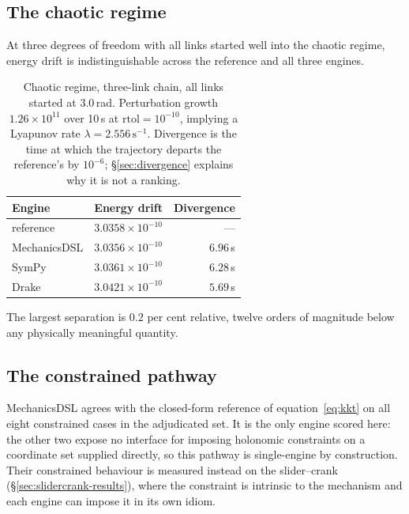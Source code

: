 \documentclass[review,12pt]{elsarticle}
\begin{document}
\subsection{The chaotic regime}\label{sec:chaotic}
At three degrees of freedom with all links started well into the chaotic regime,
energy drift is indistinguishable across the reference and all three engines.

\begin{table}[!htbp]
\centering
\caption{Chaotic regime, three-link chain, all links started at $3.0$\,rad.
Perturbation growth $1.26\times10^{11}$ over 10\,s at
$\mathrm{rtol}=10^{-10}$, implying a Lyapunov rate
$\lambda = 2.556\,\mathrm{s}^{-1}$. Divergence is the time at which the
trajectory departs the reference's by $10^{-6}$; \S\ref{sec:divergence}
explains why it is not a ranking.}
\label{tab:chaotic}
\begin{tabular}{@{}lrr@{}}
\toprule
\textbf{Engine} & \textbf{Energy drift} & \textbf{Divergence} \\
\midrule
reference    & $3.0358\times10^{-10}$ & --- \\
MechanicsDSL & $3.0356\times10^{-10}$ & $6.96$\,s \\
SymPy        & $3.0361\times10^{-10}$ & $6.28$\,s \\
Drake        & $3.0421\times10^{-10}$ & $5.69$\,s \\
\bottomrule
\end{tabular}
\end{table}

\noindent The largest separation is $0.2$ per cent relative, twelve orders of
magnitude below any physically meaningful quantity.

\subsection{The constrained pathway}\label{sec:constrained-results}
MechanicsDSL agrees with the closed-form reference of
equation~\eqref{eq:kkt} on all eight constrained cases in the adjudicated set.
It is the only engine scored here: the other two expose no interface for
imposing holonomic constraints on a coordinate set supplied directly, so this
pathway is single-engine by construction. Their constrained behaviour is
measured instead on the slider--crank (\S\ref{sec:slidercrank-results}), where
the constraint is intrinsic to the mechanism and each engine can impose it in
its own idiom.
\end{document}
